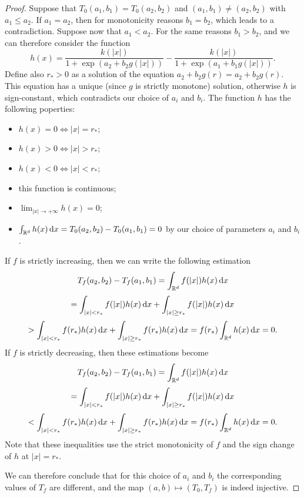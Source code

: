\documentclass{article}
\begin{document}
\begin{proof}
	Suppose that $T_0(a_1,b_1)=T_0(a_2,b_2)$ and $(a_1,b_1)\ne (a_2,b_2)$ with $a_1\le a_2$.
	If $a_1=a_2$, then for monotonicity reasons $b_1=b_2$, which leads to a contradiction.
	Suppose now that $a_1<a_2$.
	For the same reasons $b_1>b_2$, and we can therefore consider the function
	\[
		h(x) = \frac{k(|x|)}{1+\exp(a_2+b_2g(|x|))}-\frac{k(|x|)}{1+\exp(a_1+b_1g(|x|))}.
	\]
	Define also $r_*>0$ as a solution of the equation $a_2+b_2g(r)=a_2+b_2g(r)$. This equation has a unique (since $g$ is strictly monotone) solution, otherwise $h$ is sign-constant, which  contradicts our choice of $a_i$ and $b_i$.
	The function $h$ has the following poperties:
	\begin{itemize}
	\item $h(x)=0\iff |x|=r_*$;
	\item $h(x)>0\iff |x|>r_*$;
	\item $h(x)<0\iff |x|<r_*$;
	\item this function is continuous;
	\item $\lim_{|x|\to +\infty}h(x)=0$;
	\item $\int_{{\mathbb R^d}}^{}h(x){\,\mathrm{d} x}=T_0(a_2,b_2)-T_0(a_1,b_1)=0$ by our choice of parameters $a_i$ and $b_i$.
	\end{itemize}
	If $f$ is strictly increasing, then we can write the following estimation %
	\[
	T_f(a_2,b_2)-T_f(a_1,b_1)=\int_{{\mathbb R^d}}^{}f(|x|)h(x){\,\mathrm{d} x}\]
	\[=\int_{|x|<r_*}^{}f(|x|)h(x){\,\mathrm{d} x}+\int_{|x|\ge r_*}^{}f(|x|)h(x){\,\mathrm{d} x}
	\]
	\[
		> \int_{|x|<r_*}^{}f(r_*)h(x){\,\mathrm{d} x}+\int_{|x|\ge r_*}^{}f(r_*)h(x){\,\mathrm{d} x}=f(r_*)\int_{{\mathbb R^d}}^{}h(x){\,\mathrm{d} x}=0.
	\]
	If $f$ is strictly decreasing, then these estimations become
	\[
	T_f(a_2,b_2)-T_f(a_1,b_1)=\int_{{\mathbb R^d}}^{}f(|x|)h(x){\,\mathrm{d} x}\]\[=\int_{|x|<r_*}^{}f(|x|)h(x){\,\mathrm{d} x}+\int_{|x|\ge r_*}^{}f(|x|)h(x){\,\mathrm{d} x}
	\]
	\[
		< \int_{|x|<r_*}^{}f(r_*)h(x){\,\mathrm{d} x}+\int_{|x|\ge r_*}^{}f(r_*)h(x){\,\mathrm{d} x}=f(r_*)\int_{{\mathbb R^d}}^{}h(x){\,\mathrm{d} x}=0.
	\]
	Note that these inequalities use the strict monotonicity of $f$ and the sign change of $h$ at $|x|=r_*$.

	We can therefore conclude that for this choice of $a_i$ and $b_i$ the corresponding values of $T_f$ are different, and the map $(a,b)\mapsto (T_0,T_f)$ is indeed injective.

\end{proof}
\end{document}
